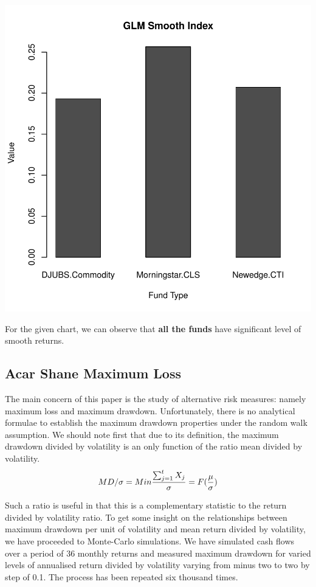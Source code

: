 \documentclass[12pt,letterpaper,english]{article}
\begin{document}
\includegraphics{CommodityReport-009}

For the given chart, we can observe that \textbf{all the funds} have significant level of smooth returns.
\subsection{Acar Shane Maximum Loss}
The main concern of this paper is the study of alternative risk measures: namely maximum loss and 
maximum drawdown. Unfortunately, there is no analytical formulae to establish the maximum drawdown properties under the random walk assumption. We should note first that due to its definition, the maximum drawdown divided by volatility is an only function of the ratio mean divided by volatility. 
\begin{equation}
MD / \sigma =  Min \frac{ \sum_{j=1}^{t} X_{j}}{\sigma} = F(\frac{\mu}{\sigma}) \\
\end{equation}

Such a ratio is useful in that this is a complementary statistic to the return divided by volatility ratio. To get some insight on the relationships between maximum drawdown per unit of volatility and mean  return divided by volatility, we have proceeded to Monte-Carlo simulations. We have simulated cash flows over a period of 36 monthly returns and measured maximum drawdown for varied levels of  annualised return divided by volatility varying from minus two to two by step of 0.1. The process has  been repeated six thousand times.
\end{document}
